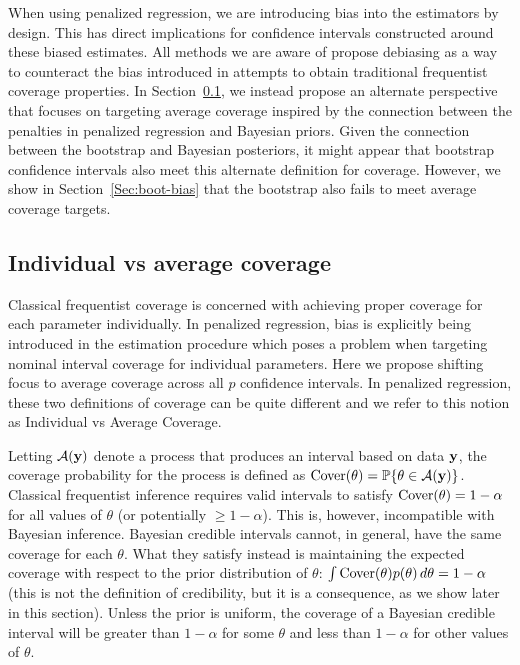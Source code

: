 
When using penalized regression, we are introducing bias into the estimators by design. This has direct implications for confidence intervals constructed around these biased estimates. All methods we are aware of propose debiasing as a way to counteract the bias introduced in attempts to obtain traditional frequentist coverage properties. In Section~\ref{Sec:IAC}, we instead propose an alternate perspective that focuses on targeting average coverage inspired by the connection between the penalties in penalized regression and Bayesian priors. Given the connection between the bootstrap and Bayesian posteriors, it might appear that bootstrap confidence intervals also meet this alternate definition for coverage. However, we show in Section~\ref{Sec:boot-bias} that the bootstrap also fails to meet average coverage targets.

\subsection{Individual vs average coverage}
\label{Sec:IAC}

Classical frequentist coverage is concerned with achieving proper coverage for each parameter individually. In penalized regression, bias is explicitly being introduced in the estimation procedure which poses a problem when targeting nominal interval coverage for individual parameters. Here we propose shifting focus to average coverage across all $p$ confidence intervals. In penalized regression, these two definitions of coverage can be quite different and we refer to this notion as Individual vs Average Coverage.

Letting $\mathcal{A}(\mathbf{y})$ denote a process that produces an interval based on data $\mathbf{y}$, the coverage probability for the process is defined as $\textrm{Cover}(\theta) = \mathbb{P}\{\theta \in \mathcal{A}(\mathbf{y})\}$. Classical frequentist inference requires valid intervals to satisfy $\textrm{Cover}(\theta) = 1 - \alpha$ for all values of $\theta$ (or potentially $\ge 1 - \alpha$). This is, however, incompatible with Bayesian inference. Bayesian credible intervals cannot, in general, have the same coverage for each $\theta$. What they satisfy instead is maintaining the expected coverage with respect to the prior distribution of $\theta$: $\int \textrm{Cover}(\theta)p(\theta) \, d\theta = 1 - \alpha$ (this is not the definition of credibility, but it is a consequence, as we show later in this section). Unless the prior is uniform, the coverage of a Bayesian credible interval will be greater than $1-\alpha$ for some $\theta$ and less than $1-\alpha$ for other values of $\theta$.

